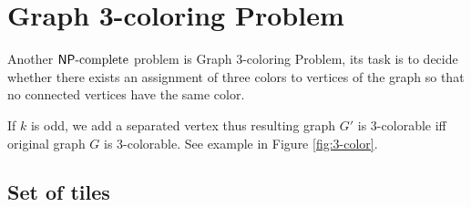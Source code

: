 \section{Graph 3-coloring Problem}



Another $\mathsf{NP}\textnormal{-complete}$ problem is Graph 3-coloring Problem, its task is to decide whether there exists an assignment of three colors to vertices of the graph so that no connected vertices have the same color.

If $k$ is odd, we add a separated vertex thus resulting graph $G'$ is 3-colorable iff original graph $G$ is 3-colorable. See example in Figure \ref{fig:3-color}.



\subsection*{Set of tiles}

